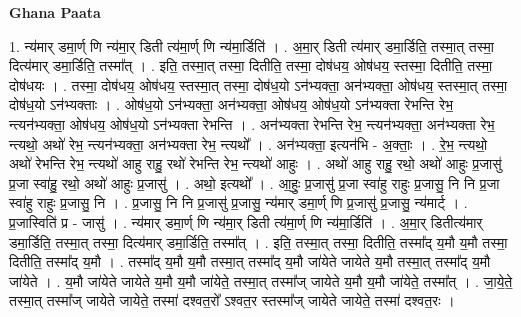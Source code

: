 \documentclass[17pt]{extarticle}
\begin{document}
\textbf{Ghana Paata } \newline

1. न्य॑मार् डमा॒र्ण् णि न्य॑मा॒र् डिती त्य॑मा॒र्ण् णि न्य॑मा॒र्डिति॑ । . अ॒मा॒र् डिती त्य॑मार् डमा॒र्डिति॒ तस्मा॒त् तस्मा॒ दित्य॑मार् डमा॒र्डिति॒ तस्मा᳚त् । . इति॒ तस्मा॒त् तस्मा॒ दितीति॒ तस्मा॒ दोष॑धय॒ ओष॑धय॒ स्तस्मा॒ दितीति॒ तस्मा॒ दोष॑धयः । . तस्मा॒ दोष॑धय॒ ओष॑धय॒ स्तस्मा॒त् तस्मा॒ दोष॑ध॒यो ऽन॑भ्यक्ता॒ अन॑भ्यक्ता॒ ओष॑धय॒ स्तस्मा॒त् तस्मा॒ दोष॑ध॒यो ऽन॑भ्यक्ताः । . ओष॑ध॒यो ऽन॑भ्यक्ता॒ अन॑भ्यक्ता॒ ओष॑धय॒ ओष॑ध॒यो ऽन॑भ्यक्ता रेभन्ति रेभ॒ न्त्यन॑भ्यक्ता॒ ओष॑धय॒ ओष॑ध॒यो ऽन॑भ्यक्ता रेभन्ति । . अन॑भ्यक्ता रेभन्ति रेभ॒ न्त्यन॑भ्यक्ता॒ अन॑भ्यक्ता रेभ॒ न्त्यथो॒ अथो॑ रेभ॒ न्त्यन॑भ्यक्ता॒ अन॑भ्यक्ता रेभ॒
न्त्यथो᳚ । . अन॑भ्यक्ता॒ इत्यन॑भि - अ॒क्ताः॒ । . रे॒भ॒ न्त्यथो॒ अथो॑ रेभन्ति रेभ॒ न्त्यथो॑ आहु राहु॒ रथो॑ रेभन्ति रेभ॒ न्त्यथो॑ आहुः । . अथो॑ आहु राहु॒ रथो॒ अथो॑ आहुः प्र॒जासु॑ प्र॒जा स्वा॑हु॒ रथो॒ अथो॑ आहुः प्र॒जासु॑ । . अथो॒ इत्यथो᳚ । . आ॒हुः॒ प्र॒जासु॑ प्र॒जा स्वा॑हु राहुः प्र॒जासु॒ नि नि प्र॒जा स्वा॑हु राहुः प्र॒जासु॒ नि । . प्र॒जासु॒ नि नि प्र॒जासु॑ प्र॒जासु॒ न्य॑मार् डमा॒र्ण् णि प्र॒जासु॑ प्र॒जासु॒ न्य॑मार्ट् । . प्र॒जास्विति॑ प्र - जासु॑ । . न्य॑मार् डमा॒र्ण् णि न्य॑मा॒र् डिती त्य॑मा॒र्ण् णि न्य॑मा॒र्डिति॑ । . अ॒मा॒र् डितीत्य॑मार् डमा॒र्डिति॒ तस्मा॒त् तस्मा॒ दित्य॑मार् डमा॒र्डिति॒ तस्मा᳚त् । . इति॒ तस्मा॒त् तस्मा॒ दितीति॒ तस्मा᳚द् य॒मौ य॒मौ तस्मा॒ दितीति॒ तस्मा᳚द् य॒मौ । . तस्मा᳚द् य॒मौ य॒मौ तस्मा॒त् तस्मा᳚द् य॒मौ जा॑येते जायेते य॒मौ तस्मा॒त् तस्मा᳚द् य॒मौ जा॑येते । . य॒मौ जा॑येते जायेते य॒मौ य॒मौ जा॑येते॒ तस्मा॒त् तस्मा᳚ज् जायेते य॒मौ य॒मौ जा॑येते॒ तस्मा᳚त् । . जा॒ये॒ते॒ तस्मा॒त् तस्मा᳚ज् जायेते जायेते॒ तस्मा॑ दश्वत॒रो᳚ ऽश्वत॒र स्तस्मा᳚ज् जायेते जायेते॒ तस्मा॑ दश्वत॒रः । \newline
\end{document}

